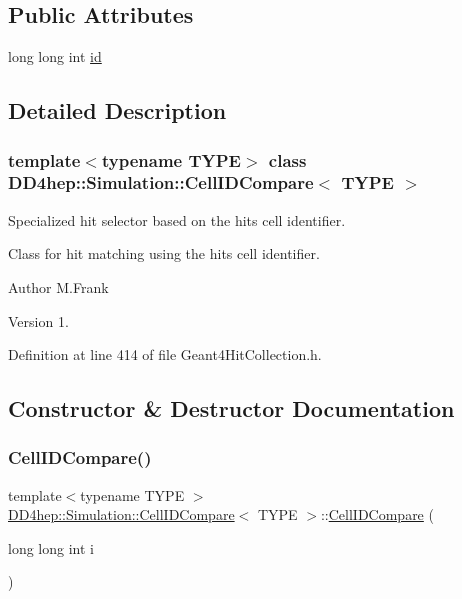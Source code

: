 \subsection*{Public Attributes}
\begin{DoxyCompactItemize}
\item 
long long int \hyperlink{class_d_d4hep_1_1_simulation_1_1_cell_i_d_compare_a7d3ef2b98bd08b158688ac8f03ea098f}{id}
\end{DoxyCompactItemize}


\subsection{Detailed Description}
\subsubsection*{template$<$typename T\+Y\+PE$>$\newline
class D\+D4hep\+::\+Simulation\+::\+Cell\+I\+D\+Compare$<$ T\+Y\+P\+E $>$}

Specialized hit selector based on the hit\textquotesingle{}s cell identifier. 

Class for hit matching using the hit\textquotesingle{}s cell identifier.

\begin{DoxyAuthor}{Author}
M.\+Frank 
\end{DoxyAuthor}
\begin{DoxyVersion}{Version}
1. 
\end{DoxyVersion}


Definition at line 414 of file Geant4\+Hit\+Collection.\+h.



\subsection{Constructor \& Destructor Documentation}
\hypertarget{class_d_d4hep_1_1_simulation_1_1_cell_i_d_compare_ad644f00808767564625f5ef98303bf0c}{}\label{class_d_d4hep_1_1_simulation_1_1_cell_i_d_compare_ad644f00808767564625f5ef98303bf0c} 
\subsubsection{\texorpdfstring{Cell\+I\+D\+Compare()}{CellIDCompare()}}
{\footnotesize\ttfamily template$<$typename T\+Y\+PE $>$ \\
\hyperlink{class_d_d4hep_1_1_simulation_1_1_cell_i_d_compare}{D\+D4hep\+::\+Simulation\+::\+Cell\+I\+D\+Compare}$<$ T\+Y\+PE $>$\+::\hyperlink{class_d_d4hep_1_1_simulation_1_1_cell_i_d_compare}{Cell\+I\+D\+Compare} (\begin{DoxyParamCaption}\item[{long long int}]{i }\end{DoxyParamCaption})\hspace{0.3cm}{\ttfamily [inline]}}



